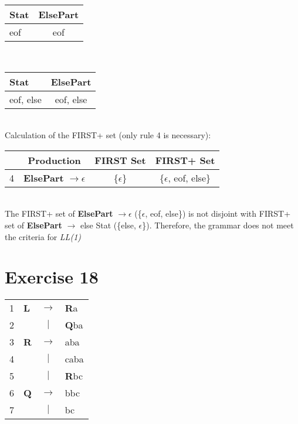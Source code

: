 \documentclass[11pt]{article} %
\begin{document}
\begin{tabular}{|p{2cm}|c|} \hline 
\textbf{Stat}
& \textbf{ElsePart} \\\hline

eof
& eof \\\hline 
\end{tabular} \\

\begin{tabular}{|p{2cm}|c|} \hline 
\textbf{Stat}
& \textbf{ElsePart} \\\hline 

eof, else
& eof, else \\\hline 
\end{tabular}\\

\noindent Calculation of the FIRST+ set (only rule 4 is necessary):\\

\begin{tabular}{|c|c|c|c|} \hline 
& Production
& FIRST Set
& FIRST+ Set \\\hline

4
& \textbf{ElsePart} $\rightarrow \epsilon$
& \{$\epsilon$\}
& \{$\epsilon$, eof, else\} \\\hline 
\end{tabular}\\

\noindent The FIRST+ set of \textbf{ElsePart} $\rightarrow \epsilon$ (\{$\epsilon$, eof, else\}) is not disjoint with FIRST+ set of \textbf{ElsePart} $\rightarrow$ else Stat (\{else, $\epsilon$\}). Therefore, the grammar does not meet the criteria for \textit{LL(1)}\\

\section*{Exercise 18}
\begin{tabular}{llcl}
1
& \textbf{L}
& $\rightarrow$
& \textbf{R}a \\

2
& 
& $\vert$
& \textbf{Q}ba \\

3
& \textbf{R}
& $\rightarrow$
& aba \\

4
& 
& $\vert$
& caba \\

5
& 
& $\vert$
& \textbf{R}bc \\

6
& \textbf{Q}
& $\rightarrow$
& bbc \\

7
& 
& $\vert$
& bc \\
\end{tabular}\\
\end{document}
